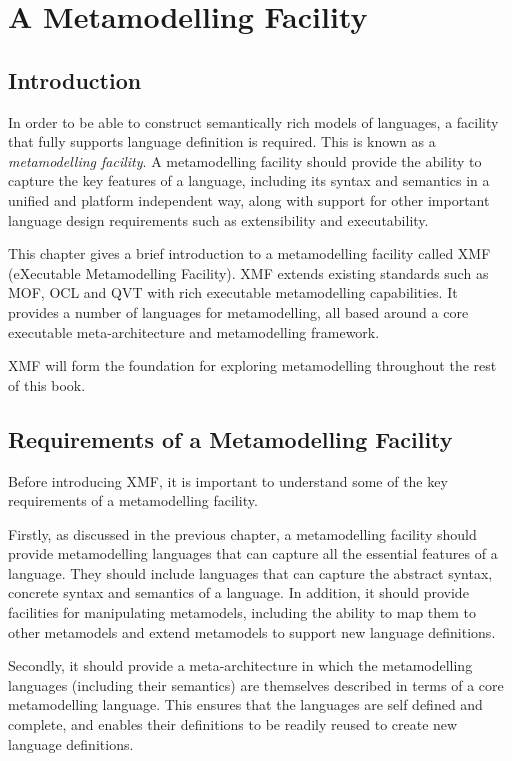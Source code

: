 \chapter{A Metamodelling Facility}
\label{xmfchapter}

\section{Introduction}

In order to be able to construct semantically rich models of
languages, a facility that fully supports language definition is
required. This is known as a {\em metamodelling facility}. A
metamodelling facility should provide the ability to capture the
key features of a language, including its syntax and semantics in
a unified and platform independent way, along with support for
other important language design requirements such as extensibility
and executability.

This chapter gives a brief introduction to a metamodelling
facility called XMF (eXecutable Metamodelling Facility). XMF
extends existing standards such as MOF, OCL and QVT with rich
executable metamodelling capabilities. It provides a number of
languages for metamodelling, all based around a core executable
meta-architecture and metamodelling framework.

XMF will form the foundation for exploring metamodelling
throughout the rest of this book.

\section{Requirements of a Metamodelling Facility}

Before introducing XMF, it is important to understand some of the
key requirements of a metamodelling facility.

Firstly, as discussed in the previous chapter, a metamodelling
facility should provide metamodelling languages that can capture
all the essential features of a language. They should include
languages that can capture the abstract syntax, concrete syntax
and semantics of a language. In addition, it should provide
facilities for manipulating metamodels, including the ability to
map them to other metamodels and extend metamodels to support new
language definitions.

Secondly, it should provide a meta-architecture in which the
metamodelling languages (including their semantics) are themselves
described in terms of a core metamodelling language. This ensures
that the languages are self defined and complete, and enables
their definitions to be readily reused to create new language
definitions.

